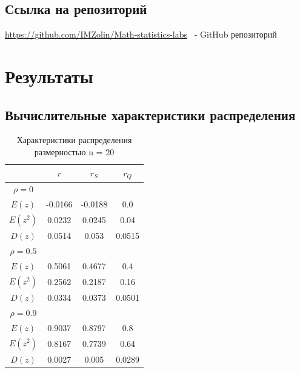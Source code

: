 \documentclass[a4paper,14pt]{article}
\begin{document}
		\subsection{Ссылка на репозиторий}
		\url{https://github.com/IMZolin/Math-statistics-labs} \ - GitHub репозиторий
	
	\section{Результаты}
	\subsection{Вычислительные характеристики распределения}
	\begin{table}[H]
		\centering
		\begin{tabular}{|c|c|c|c|}
			\hline
			& $r$ & $r_S$ & $r_Q$\\\hline
			$\rho=0$ & & &\\\hline
			$E(z)$ & -0.0166 & -0.0188 & 0.0\\\hline
			$E(z^2)$ & 0.0232 & 0.0245 & 0.04\\\hline
			$D(z)$ & 0.0514 & 0.053 & 0.0515\\\hline
			\hline
			$\rho=0.5$ & & &\\\hline
			$E(z)$ & 0.5061 & 0.4677 & 0.4\\\hline
			$E(z^2)$ & 0.2562 & 0.2187 & 0.16\\\hline
			$D(z)$ & 0.0334 & 0.0373 & 0.0501\\\hline
			\hline
			$\rho=0.9$ & & &\\\hline
			$E(z)$ & 0.9037 & 0.8797 & 0.8\\\hline
			$E(z^2)$ & 0.8167 & 0.7739 & 0.64\\\hline
			$D(z)$ & 0.0027 & 0.005 & 0.0289\\\hline
		\end{tabular}
		\caption{Характеристики распределения размерностью n = 20}
	\end{table}
	
\end{document}
